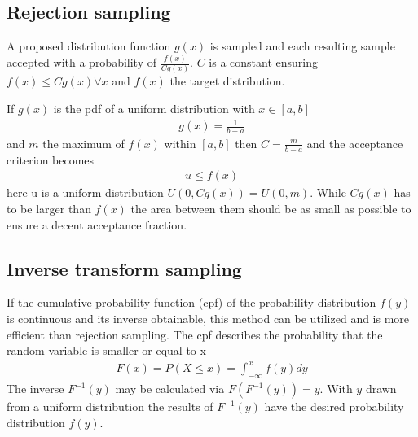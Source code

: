 \documentclass[letterpaper,10pt,english]{sphinxmanual}
\begin{document}
\subsection{Rejection sampling}
\label{\detokenize{NBodySimulation/Initialization:rejection-sampling}}
\sphinxAtStartPar
A proposed distribution function \(g(x)\) is sampled and each resulting sample accepted with a probability of \(\frac{f(x)}{Cg(x)}\).
\(C\) is a constant ensuring \(f(x)\leqslant Cg(x) \forall x\) and \(f(x)\) the target distribution.

\sphinxAtStartPar
If \(g(x)\) is the pdf of a uniform distribution with \(x \in \left [ a,b \right ]\)
\begin{equation*}
\begin{split}g(x)=\frac{1}{b-a}\end{split}
\end{equation*}
\sphinxAtStartPar
and \(m\) the maximum of \(f(x)\) within \(\left [ a,b \right ]\) then \(C=\frac{m}{b-a}\) and the acceptance criterion becomes
\begin{equation*}
\begin{split}u \leq f(x)\end{split}
\end{equation*}
\sphinxAtStartPar
here u is a uniform distribution \(U(0,Cg(x)) = U(0,m)\). While \(Cg(x)\) has to be larger than \(f(x)\) the area between them should be as small as possible to ensure a decent acceptance fraction.


\subsection{Inverse transform sampling}
\label{\detokenize{NBodySimulation/Initialization:inverse-transform-sampling}}
\sphinxAtStartPar
If the cumulative probability function (cpf) of the probability distribution \(f(y)\) is continuous and its inverse obtainable, this method can be utilized and is more efficient than rejection sampling.
The cpf describes the probability that the random variable is smaller or equal to x
\begin{equation*}
\begin{split}F(x)=P(X \leq x) = \int_{-\infty }^{x}f(y) dy\end{split}
\end{equation*}
\sphinxAtStartPar
The inverse \(F^{-1}(y)\) may be calculated via \(F(F^{-1}(y)) = y\). With \(y\) drawn from a uniform distribution the results of \(F^{-1}(y)\) have the desired probability distribution \(f(y)\).
\end{document}
